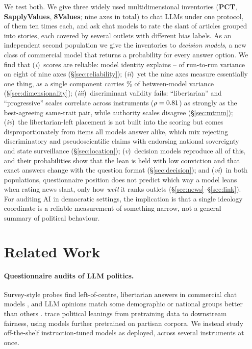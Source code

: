 \documentclass[11pt]{article}
\newcommand{\instPCT}[1]{\textcolor{cPCT}{\textbf{#1}}}
\newcommand{\instSAP}[1]{\textcolor{cSAP}{\textbf{#1}}}
\newcommand{\instEV}[1]{\textcolor{cEV}{\textbf{#1}}}
\newcommand{\pct}{\instPCT{PCT}\xspace}
\newcommand{\sap}{\instSAP{SapplyValues}\xspace}
\newcommand{\ev}{\instEV{8Values}\xspace}
\begin{document}
We test both. We give three widely used multidimensional inventories (\pct, \sap, \ev; nine axes in total) to \nNModels{} chat LLMs under one protocol, \nNModelsMulti{} of them ten times each, and ask \nNModelsNews{} chat models to rate the slant of \nNArticles{} articles grouped into \nNStories{} stories, each covered by several outlets with different bias labels. As an independent second population we give the inventories to \nDNComplete{} \emph{decision models}, a new class of commercial model that returns a probability for every answer option. We find that (\textit{i})~scores are reliable: model identity explains \nEtaMinOther--\nEtaMax{} of run-to-run variance on eight of nine axes (\S\ref{sec:reliability}); (\textit{ii})~yet the nine axes measure essentially one thing, as a single component carries \nPCOneShare\% of between-model variance (\S\ref{sec:dimensionality}); (\textit{iii})~discriminant validity fails: ``libertarian'' and ``progressive'' scales correlate across instruments ($\rho=0.81$) as strongly as the best-agreeing same-trait pair, while authority scales disagree (\S\ref{sec:mtmm}); (\textit{iv})~the libertarian-left placement is not built into the scoring but comes disproportionately from items all models answer alike, which mix rejecting discriminatory and pseudoscientific claims with endorsing national sovereignty and state surveillance (\S\ref{sec:location}); (\textit{v})~decision models reproduce all of this, and their probabilities show that the lean is held with low conviction and that exact answers change with the question format (\S\ref{sec:decision}); and (\textit{vi})~in both populations, questionnaire position does not predict which way a model leans when rating news slant, only how \emph{well} it ranks outlets (\S\ref{sec:news}--\S\ref{sec:link}). For auditing AI in democratic settings, the implication is that a single ideology coordinate is a reliable measurement of something narrow, not a general summary of political behaviour.

\section{Related Work}

\paragraph{Questionnaire audits of LLM politics.}
Survey-style probes find left-of-centre, libertarian answers in commercial chat models \citep{hartmann2023political,motoki2024more,10.1371/journal.pone.0306621}, and LLM opinions match some demographic or national groups better than others \citep{santurkar2023whose,durmus2023towards}. \citet{feng-etal-2023-pretraining} trace political leanings from pretraining data to downstream fairness, using models further pretrained on partisan corpora. We instead study off-the-shelf instruction-tuned models as deployed, across several instruments at once.
\end{document}
